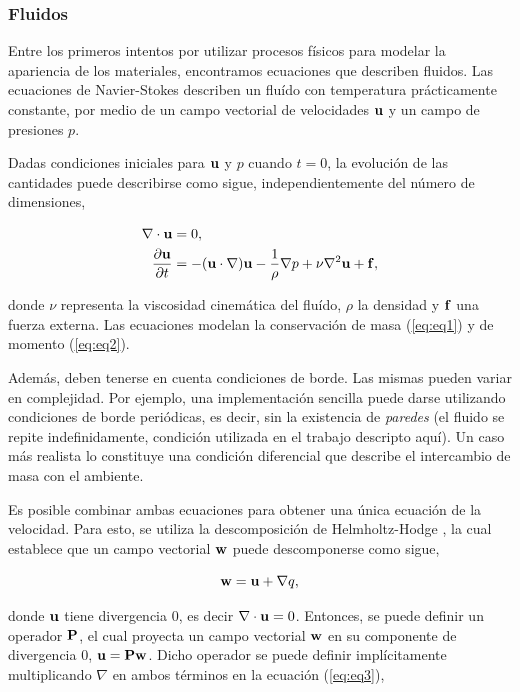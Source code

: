 \subsubsection{Fluidos}
Entre los primeros intentos por utilizar procesos físicos para modelar la apariencia de los materiales, encontramos ecuaciones que describen fluidos.
Las ecuaciones de Navier-Stokes describen un fluído con temperatura prácticamente constante, por medio de un campo vectorial de velocidades $\bold{u}$ y un campo de presiones $p$.

Dadas condiciones iniciales para $\bold{u}$ y $p$ cuando $t = 0$, la evolución de las cantidades puede describirse como sigue, independientemente del número de dimensiones,

\begin{align}
\nabla \cdot \bold{u} &= 0, \label{eq:eq1}\\
\frac{\partial \bold{u} }{\partial t} &= - (\bold{u} \cdot \nabla) \bold{u} - \frac{1}{\rho} \nabla p + \nu \nabla^{2} \bold{u} + \bold{f} \label{eq:eq2},
\end{align}

\noindent donde $\nu$ representa la viscosidad cinemática del fluído, $\rho$ la densidad y $\bold{f}$ una fuerza externa.
Las ecuaciones modelan la conservación de masa (\ref{eq:eq1}) y de momento (\ref{eq:eq2}).

Además, deben tenerse en cuenta condiciones de borde.
Las mismas pueden variar en complejidad.
Por ejemplo, una implementación sencilla puede darse utilizando condiciones de borde periódicas, es decir, sin la existencia de {\em paredes} (el fluido se repite indefinidamente, condición utilizada en el trabajo descripto aquí).
Un caso más realista lo constituye una condición diferencial que describe el intercambio de masa con el ambiente.

Es posible combinar ambas ecuaciones para obtener una única ecuación de la velocidad.
Para esto, se utiliza la descomposición de Helmholtz-Hodge \cite{Chorin1990}, la cual establece que un campo vectorial $\bold{w}$ puede descomponerse como sigue, 

\begin{equation}
\label{eq:eq3}
\bold{w} = \bold{u} + \nabla q,
\end{equation}

\noindent donde $\bold{u}$ tiene divergencia $0$, es decir $\nabla\cdot\bold{u} = 0$.
Entonces, se puede definir un operador $\bold{P}$, el cual proyecta un campo vectorial $\bold{w}$ en su componente de divergencia $0$, $\bold{u} = \bold{P}\bold{w}$.
Dicho operador se puede definir implícitamente multiplicando $\nabla$ en ambos términos en la ecuación (\ref{eq:eq3}),

